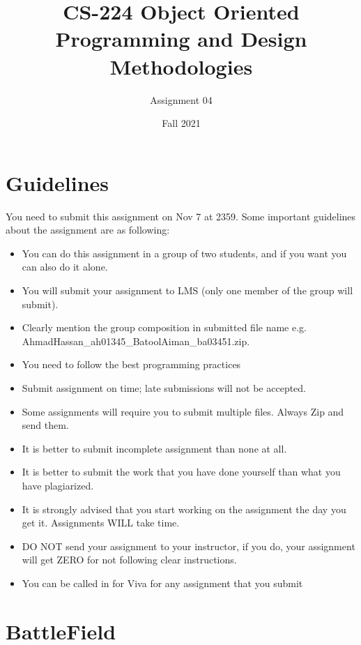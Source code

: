 \documentclass[a4paper,12pt]{article}
\begin{document}
	
	\title{CS-224 Object Oriented Programming and Design Methodologies }
	\author{Assignment 04}
	\date{Fall 2021}
	\maketitle
	\section{Guidelines}
	You need to submit this assignment on  {\color{red}Nov 7 at 2359}. Some important guidelines about the assignment are as following:
	
	\begin{itemize}
		\item You can do this assignment in a group of two students, and if you want you can also do it alone.
		\item You will submit your assignment to LMS (only one member of the group will submit).
		\item Clearly mention the group composition in submitted file name e.g. AhmadHassan\_ah01345\_BatoolAiman\_ba03451.zip. 
		\item You need to follow the best programming practices 
		\item Submit assignment on time; late submissions will not be accepted.
		\item Some assignments will require you to submit multiple files. Always Zip and send them.
		\item It is better to submit incomplete assignment than none at all.
		\item It is better to submit the work that you have done yourself than what you have plagiarized.
		\item It is strongly advised that you start working on the assignment the day you get it. Assignments WILL take time.
		\item DO NOT send your assignment to your instructor, if you do, your assignment will get ZERO for not following clear instructions.
		\item You can be called in for Viva for any assignment that you submit
	\end{itemize}
	

	

	\section{BattleField}
	
\end{document}
